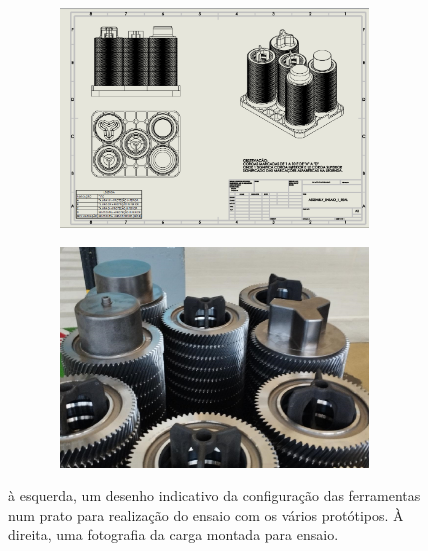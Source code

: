 \begin{figure}[htb!]
    \centering
    \begin{subfigure}{.5\textwidth}\
        \centering
        \includegraphics[width = 0.9\textwidth]{Figures/Cap3/Esquema_Prato_Ensaio_08-05-2023.png}
        \caption{}  
    \end{subfigure}%
    \begin{subfigure}{.5\textwidth}\
        \centering
        \includegraphics[width = 0.9\textwidth]{Figures/Cap3/Ensaio_varias_tampas.png}
        \caption{}  
    \end{subfigure}%
    \caption[Configuração do ensaio dos vários protótipos]%
    {à esquerda, um desenho indicativo da configuração das ferramentas num prato para realização do ensaio com os vários protótipos. À direita, uma fotografia da carga montada para ensaio.}
    \label{fig:configuracao_ensaio}
\end{figure}

